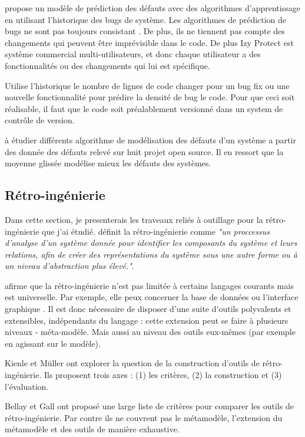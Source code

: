 \documentclass[a4paper]{article}
\begin{document}
\cite{kim07,Bibi06} propose  un modèle de prédiction des défauts avec des algorithmes d'apprentissage en utilisant l'historique des bugs de système. 
Les algorithmes de prédiction de bugs ne sont pas toujours consistant \cite{bang19}. De plus, ils ne tiennent pas compte des changements qui peuvent être imprévisible dans le code. De plus Izy Protect est système commercial multi-utilisateurs, et donc chaque utilisateur a des fonctionnalités ou des changements qui lui est spécifique. 

\cite{naga05} Utilise l'historique le nombre de lignes de code changer pour un bug fix ou une nouvelle fonctionnalité pour prédire la densité de bug  le code. Pour que ceci soit réalisable, il faut que le code soit préalablement versionné dans un system de contrôle de version.

\cite{Raja09} à étudier différents algorithme de modélisation des défauts d'un système a partir des donnée des défauts relevé sur huit projet open source. Il en ressort que la moyenne glissée modélise mieux les défauts des systèmes.

\subsection{Rétro-ingénierie}
\label{sec:retroingenierie}
Dans cette section, je presenterais  les traveaux reliés à outillage pour la rétro-ingénierie que j'ai étudié.
\cite{Chik90a} définit la rétro-ingénierie comme \textit{"un proccessus 
 d'analyse d'un système donnée pour identifier les composants du système et leurs relations,
afin de créer des représentations du système sous une autre forme ou à un niveau d'abstraction plus élevé."}.

\cite{Brun14c} afirme que la rétro-ingénierie  n'est pas limitée à certains langages courants 
 mais est universelle. 
Par exemple, elle peux concerner  la base de données \citep{Delp20a} ou  l'interface graphique \citep{Verh19a}.
Il est donc nécessaire de disposer d'une suite d'outils polyvalents et extensibles, indépendants du langage : cette extension peut se faire à plusieurs niveaux - méta-modèle.
Mais aussi au niveau des outils eux-mêmes (par exemple en agissant sur le modèle).

Kienle et Müller \cite{Kien10a} ont explorer la question de la construction d'outils de rétro-ingénierie.
 Ils proposent trois axes : (1) les critères, (2) la construction et (3) l'évaluation.

Bellay et Gall \cite{Bell98a} ont proposé une large liste de critères pour comparer les outils de rétro-ingénierie.
Par contre ils ne couvrent  pas le métamodèle, l'extension du métamodèle et des outils de manière exhaustive.
\end{document}
